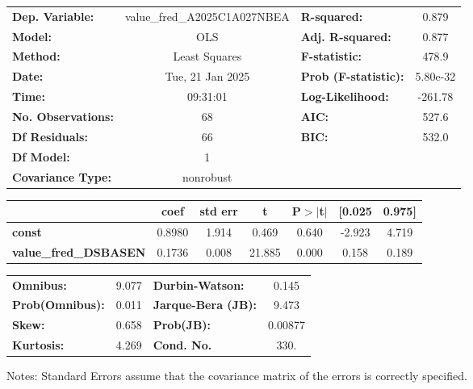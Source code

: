 \begin{center}
\begin{tabular}{lclc}
\toprule
\textbf{Dep. Variable:}       & value\_fred\_A2025C1A027NBEA & \textbf{  R-squared:         } &     0.879   \\
\textbf{Model:}               &             OLS              & \textbf{  Adj. R-squared:    } &     0.877   \\
\textbf{Method:}              &        Least Squares         & \textbf{  F-statistic:       } &     478.9   \\
\textbf{Date:}                &       Tue, 21 Jan 2025       & \textbf{  Prob (F-statistic):} &  5.80e-32   \\
\textbf{Time:}                &           09:31:01           & \textbf{  Log-Likelihood:    } &   -261.78   \\
\textbf{No. Observations:}    &                68            & \textbf{  AIC:               } &     527.6   \\
\textbf{Df Residuals:}        &                66            & \textbf{  BIC:               } &     532.0   \\
\textbf{Df Model:}            &                 1            & \textbf{                     } &             \\
\textbf{Covariance Type:}     &          nonrobust           & \textbf{                     } &             \\
\bottomrule
\end{tabular}
\begin{tabular}{lcccccc}
                              & \textbf{coef} & \textbf{std err} & \textbf{t} & \textbf{P$> |$t$|$} & \textbf{[0.025} & \textbf{0.975]}  \\
\midrule
\textbf{const}                &       0.8980  &        1.914     &     0.469  &         0.640        &       -2.923    &        4.719     \\
\textbf{value\_fred\_DSBASEN} &       0.1736  &        0.008     &    21.885  &         0.000        &        0.158    &        0.189     \\
\bottomrule
\end{tabular}
\begin{tabular}{lclc}
\textbf{Omnibus:}       &  9.077 & \textbf{  Durbin-Watson:     } &    0.145  \\
\textbf{Prob(Omnibus):} &  0.011 & \textbf{  Jarque-Bera (JB):  } &    9.473  \\
\textbf{Skew:}          &  0.658 & \textbf{  Prob(JB):          } &  0.00877  \\
\textbf{Kurtosis:}      &  4.269 & \textbf{  Cond. No.          } &     330.  \\
\bottomrule
\end{tabular}
\end{center}

Notes: \newline
 [1] Standard Errors assume that the covariance matrix of the errors is correctly specified.